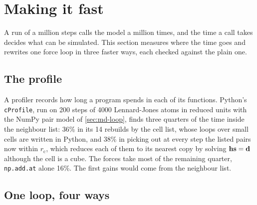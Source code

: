 \section{Making it fast}
\label{sec:md-speed}

A run of a million steps calls the model a million times, and the time a
call takes decides what can be simulated. This section measures where the
time goes and rewrites one force loop in three faster ways, each checked
against the plain one.

\subsection*{The profile}

A profiler records how long a program spends in each of its functions.
Python's \texttt{cProfile}, run on 200 steps of 4000 Lennard-Jones atoms
in reduced units with the NumPy pair model of \cref{sec:md-loop}, finds
three quarters of the time inside the neighbour list: 36\% in its 14
rebuilds by the cell list, whose loops over small cells are written in
Python, and 38\% in picking out at every step the listed pairs now within
$r_{\mathrm c}$, which reduces each of them to its nearest copy by solving
$\bm{\mathrm{h}}\bm{\mathrm{s}} = \bm{\mathrm{d}}$ although the cell is a cube. The forces take most
of the remaining quarter, \texttt{np.add.at} alone 16\%. The first gains
would come from the neighbour list.

\subsection*{One loop, four ways}

